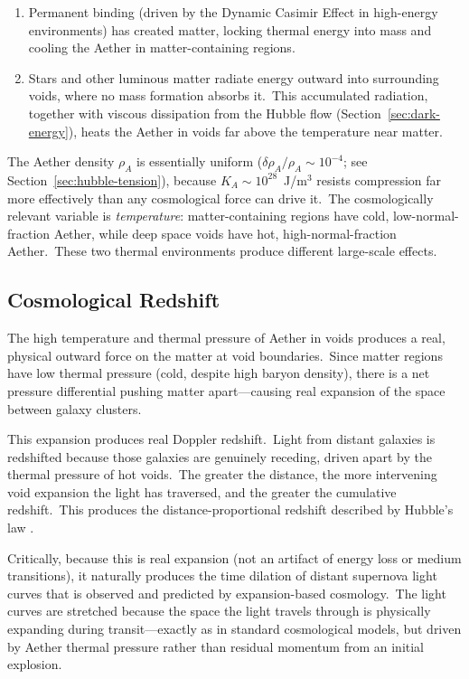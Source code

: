 ﻿\documentclass[12pt,letterpaper]{article}
\newcommand{\rhoa}{\rho_{\!A}}
\newcommand{\Ka}{K_{\!A}}
\begin{document}
\begin{enumerate}[leftmargin=2em]
  \item Permanent binding (driven by the Dynamic Casimir Effect in high-energy environments)
    has created matter, locking thermal energy into mass and cooling the Aether in
    matter-containing regions.

  \item Stars and other luminous matter radiate energy outward into surrounding voids, where
    no mass formation absorbs it.\ This accumulated radiation, together with viscous
    dissipation from the Hubble flow (Section~\ref{sec:dark-energy}), heats the Aether in
    voids far above the temperature near matter.
\end{enumerate}

The Aether density $\rhoa$ is essentially uniform ($\delta\rhoa/\rhoa \sim
10^{-4}$; see Section~\ref{sec:hubble-tension}), because $\Ka \sim
10^{28}$~J/m$^3$ resists compression far more effectively than any cosmological
force can drive it.\ The cosmologically relevant variable is \emph{temperature}:
matter-containing regions have cold, low-normal-fraction Aether, while deep space
voids have hot, high-normal-fraction Aether.\ These two thermal environments
produce different large-scale effects.


\subsection{Cosmological Redshift}

The high temperature and thermal pressure of Aether in voids produces a real, physical
outward force on the matter at void boundaries.\ Since matter regions have low thermal
pressure (cold, despite high baryon density), there is a net pressure differential pushing matter
apart---causing real expansion of the space between galaxy clusters.

This expansion produces real Doppler redshift.\ Light from distant galaxies is redshifted
because those galaxies are genuinely receding, driven apart by the thermal pressure of hot
voids.\ The greater the distance, the more intervening void expansion the light has
traversed, and the greater the cumulative redshift.\ This produces the distance-proportional
redshift described by Hubble's law \cite{hubble1929}.

Critically, because this is real expansion (not an artifact of energy loss or medium
transitions), it naturally produces the time dilation of distant supernova light curves
that is observed and predicted by expansion-based cosmology.\ The light curves are stretched
because the space the light travels through is physically expanding during transit---exactly as in standard cosmological models, but driven by Aether thermal pressure rather
than residual momentum from an initial explosion.
\end{document}
